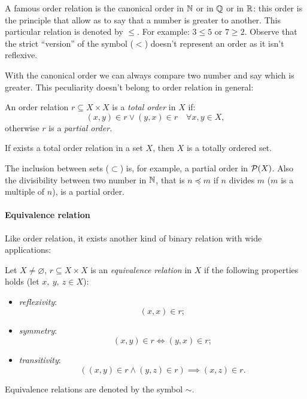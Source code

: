 A famous order relation is the canonical order in $\mathbb N$ or in $\mathbb Q$ or in $\mathbb R$: this order is the principle that allow as to say that a number is greater to another. This particular relation is denoted by $\leq$. For example: $3 \leq 5$ or $7 \geq 2$. Observe that the strict ``version'' of the symbol ($<$) doesn't represent an order as it isn't reflexive.

With the canonical order we can always compare two number and say which is greater. This peculiarity doesn't belong to order relation in general:

\begin{defn}
	An order relation $r \subseteq X \times X$ is a \emph{total order} in $X$ if: 
	$$
		(x,y) \in r 
		\vee (y,x) \in r 
		\quad \forall x,y \in X
	,
	$$
	otherwise $r$ is a \emph{partial order}.
\end{defn} 

If exists a total order relation in a set $X$, then $X$ is a totally ordered set.

The inclusion between sets ($\subset$) is, for example, a partial order in $\mathcal P(X)$. Also the divisibility between two number in $\mathbb N$, that is $n \preceq m$ if $n$ divides $m$ ($m$ is a multiple of $n$), is a partial order.


\paragraph{Equivalence relation} Like order relation, it exists another kind of binary relation with wide applications:
\begin{defn}
	Let $X \neq \varnothing$, $r \subseteq X \times X$ is an \emph{equivalence relation} in $X$ if the following properties holds (let $x,\ y,\ z \in X$):
	\begin{itemize}
		\item \emph{reflexivity}: $$\left(x,x\right)\in r;$$
		\item \emph{symmetry}: $$\left(x,y\right)\in r\iff\left(y,x\right)\in r;$$
		\item \emph{transitivity}: $$\left(\left(x,y\right)\in r \wedge \left(y,z\right)\in r\right)\implies \left(x,z\right)\in r.$$
	\end{itemize}
	Equivalence relations are denoted by the symbol $\sim$.
\end{defn}

